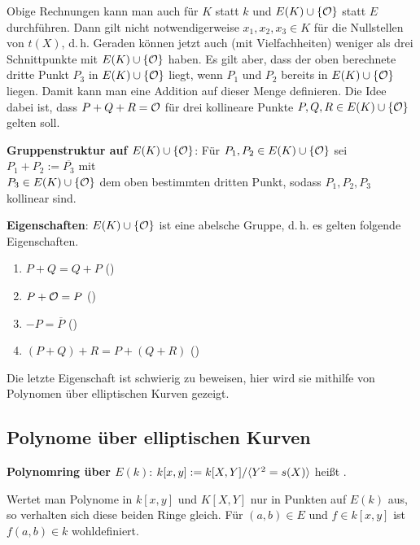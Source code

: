 Obige Rechnungen kann man auch für $K$ statt $k$ und $E(K) \cup \{\mathcal{O}\}$ statt $E$ durchführen.
Dann gilt nicht notwendigerweise $x_1, x_2, x_3 \in K$ für die Nullstellen von $t(X)$, d.\,h.
Geraden können jetzt auch (mit Vielfachheiten) weniger als drei Schnittpunkte mit
$E(K) \cup \{\mathcal{O}\}$ haben.
Es gilt aber, dass der oben berechnete dritte Punkt $P_3$ in $E(K) \cup \{\mathcal{O}\}$ liegt,
wenn $P_1$ und $P_2$ bereits in $E(K) \cup \{\mathcal{O}\}$ liegen.
Damit kann man eine Addition auf dieser Menge definieren.
Die Idee dabei ist, dass $P + Q + R = \mathcal{O}$ für drei kollineare Punkte $P, Q, R \in E(K) \cup \{\mathcal{O}\}$
gelten soll.

\textbf{Gruppenstruktur auf $E(K) \cup \{\mathcal{O}\}$}:
Für $P_1, P_2 \in E(K) \cup \{\mathcal{O}\}$ sei $P_1 + P_2 := \overline{P_3}$ mit\\
$P_3 \in E(K) \cup \{\mathcal{O}\}$ dem oben bestimmten dritten Punkt, sodass $P_1, P_2, P_3$ kollinear
sind.

\textbf{Eigenschaften}:
$E(K) \cup \{\mathcal{O}\}$ ist eine abelsche Gruppe, d.\,h. es gelten folgende Eigenschaften.
\begin{enumerate}
    \item
    $P + Q = Q + P$
    ()
    
    \item
    $P + \mathcal{O} = P$
    ()
    
    \item
    $-P = \overline{P}$
    ()
    
    \item
    $(P + Q) + R = P + (Q + R)$
    ()
\end{enumerate}
Die letzte Eigenschaft ist schwierig zu beweisen,
hier wird sie mithilfe von Polynomen über elliptischen Kurven gezeigt.

\pagebreak

\subsection{%
    Polynome über elliptischen Kurven%
}

\textbf{Polynomring über $E(k)$}:
$k[x, y] := k[X, Y]/\langle Y^2 = s(X)\rangle$ heißt .

Wertet man Polynome in $k[x, y]$ und $K[X, Y]$ nur in Punkten auf $E(k)$ aus, so verhalten
sich diese beiden Ringe gleich.
Für $(a, b) \in E$ und $f \in k[x, y]$ ist $f(a, b) \in k$ wohldefiniert.

